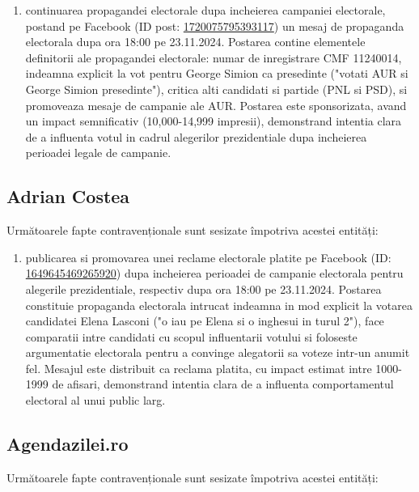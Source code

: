 \documentclass[a4paper,12pt]{article}
\begin{document}
\begin{enumerate}[leftmargin=*, label=\arabic*.)]
    \item continuarea propagandei electorale dupa incheierea campaniei electorale, postand pe Facebook (ID post: \href{https://www.facebook.com/ads/library/?id=1720075795393117}{1720075795393117}) un mesaj de propaganda electorala dupa ora 18:00 pe 23.11.2024. Postarea contine elementele definitorii ale propagandei electorale: numar de inregistrare CMF 11240014, indeamna explicit la vot pentru George Simion ca presedinte ("votati AUR si George Simion presedinte"), critica alti candidati si partide (PNL si PSD), si promoveaza mesaje de campanie ale AUR. Postarea este sponsorizata, avand un impact semnificativ (10,000-14,999 impresii), demonstrand intentia clara de a influenta votul in cadrul alegerilor prezidentiale dupa incheierea perioadei legale de campanie.
\end{enumerate}

\vspace{0.5cm}

\subsection{Adrian Costea}
Următoarele fapte contravenționale sunt sesizate împotriva acestei entități:

\begin{enumerate}[leftmargin=*, label=\arabic*.)]
    \item publicarea si promovarea unei reclame electorale platite pe Facebook (ID: \href{https://www.facebook.com/ads/library/?id=1649645469265920}{1649645469265920}) dupa incheierea perioadei de campanie electorala pentru alegerile prezidentiale, respectiv dupa ora 18:00 pe 23.11.2024. Postarea constituie propaganda electorala intrucat indeamna in mod explicit la votarea candidatei Elena Lasconi ("o iau pe Elena si o inghesui in turul 2"), face comparatii intre candidati cu scopul influentarii votului si foloseste argumentatie electorala pentru a convinge alegatorii sa voteze intr-un anumit fel. Mesajul este distribuit ca reclama platita, cu impact estimat intre 1000-1999 de afisari, demonstrand intentia clara de a influenta comportamentul electoral al unui public larg.
\end{enumerate}

\vspace{0.5cm}

\subsection{Agendazilei.ro}
Următoarele fapte contravenționale sunt sesizate împotriva acestei entități:
\end{document}
